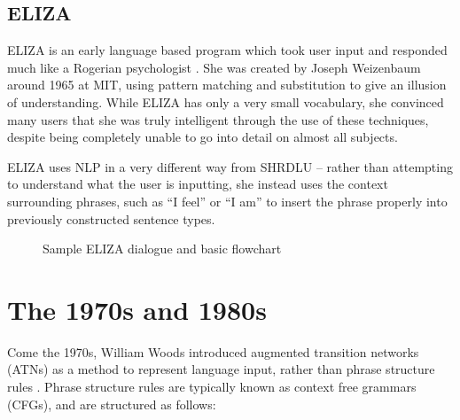 \subsection{ELIZA}                                                                     
                                                                                          
ELIZA is an early language based program which took user input and responded much like a Rogerian psychologist \cite{Weizenbaum}. She was created by Joseph Weizenbaum around 1965 at MIT, using pattern matching and substitution to give an illusion of understanding. While ELIZA has only a very small vocabulary, she convinced many users that she was truly intelligent through the use of these techniques, despite being completely unable to go into detail on almost all subjects.

ELIZA uses NLP in a very different way from SHRDLU -- rather than attempting to understand what the user is inputting, she instead uses the context surrounding phrases, such as ``I feel'' or ``I am'' to insert the phrase properly into previously constructed sentence types.



\begin{figure}[!ht]
	\begin{center}
	\end{center}
	\caption{Sample ELIZA dialogue and basic flowchart}\label{ELIZA}
\end{figure}                                                                                               



\section{The 1970s and 1980s}
Come the 1970s, William Woods introduced augmented transition networks (ATNs) as a method to represent language input, rather than phrase structure rules \cite{Woods}. Phrase structure rules are typically known as context free grammars (CFGs), and are structured as follows:

